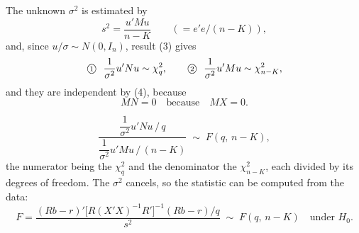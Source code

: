 \documentclass[11pt]{article}
\begin{document}
The unknown $\sigma^{2}$ is estimated by
\[ s^{2} = \frac{u'Mu}{n - K} \qquad (= e'e/(n - K)), \]
and, since $u/\sigma \sim N(0, I_{n})$, result (3) gives
\[ \text{\textcircled{\scriptsize 1}}\ \ \frac{1}{\sigma^{2}}u'Nu \sim \chi^{2}_{q}, \qquad
   \text{\textcircled{\scriptsize 2}}\ \ \frac{1}{\sigma^{2}}u'Mu \sim \chi^{2}_{n-K}, \]
and they are independent by (4), because
\[ MN = 0 \quad\text{because}\quad MX = 0. \]

\[ \frac{\dfrac{1}{\sigma^{2}}u'Nu\,\big/\,q}{\dfrac{1}{\sigma^{2}}u'Mu\,\big/\,(n - K)}
   \;\sim\; F(q,\, n - K), \]
the numerator being the $\chi^{2}_{q}$ and the denominator the $\chi^{2}_{n-K}$, each
divided by its degrees of freedom. The $\sigma^{2}$ cancels, so the statistic can be
computed from the data:
\[ F = \frac{(Rb - r)'\bigl[R(X'X)^{-1}R'\bigr]^{-1}(Rb - r)/q}{s^{2}}
   \;\sim\; F(q,\, n - K) \quad\text{under } H_{0}. \]
\end{document}
